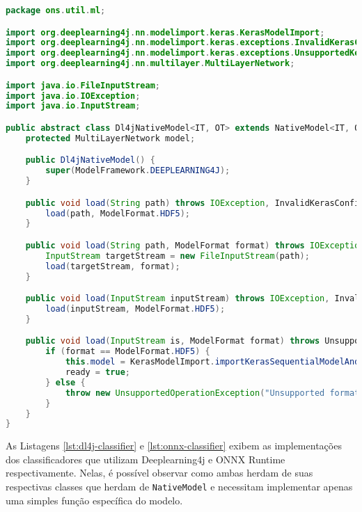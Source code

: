 \begin{lstlisting}[language=Java, caption=Implementação da classe Dl4jNativeModel, label={lst:dl4j-native-model}]
package ons.util.ml;

import org.deeplearning4j.nn.modelimport.keras.KerasModelImport;
import org.deeplearning4j.nn.modelimport.keras.exceptions.InvalidKerasConfigurationException;
import org.deeplearning4j.nn.modelimport.keras.exceptions.UnsupportedKerasConfigurationException;
import org.deeplearning4j.nn.multilayer.MultiLayerNetwork;

import java.io.FileInputStream;
import java.io.IOException;
import java.io.InputStream;

public abstract class Dl4jNativeModel<IT, OT> extends NativeModel<IT, OT> {
    protected MultiLayerNetwork model;

    public Dl4jNativeModel() {
        super(ModelFramework.DEEPLEARNING4J);
    }

    public void load(String path) throws IOException, InvalidKerasConfigurationException, UnsupportedKerasConfigurationException {
        load(path, ModelFormat.HDF5);
    }

    public void load(String path, ModelFormat format) throws IOException, UnsupportedKerasConfigurationException, InvalidKerasConfigurationException {
        InputStream targetStream = new FileInputStream(path);
        load(targetStream, format);
    }

    public void load(InputStream inputStream) throws IOException, InvalidKerasConfigurationException, UnsupportedKerasConfigurationException {
        load(inputStream, ModelFormat.HDF5);
    }

    public void load(InputStream is, ModelFormat format) throws UnsupportedKerasConfigurationException, IOException, InvalidKerasConfigurationException {
        if (format == ModelFormat.HDF5) {
            this.model = KerasModelImport.importKerasSequentialModelAndWeights(is);
            ready = true;
        } else {
            throw new UnsupportedOperationException("Unsupported format");
        }
    }
}
\end{lstlisting}

As Listagens \ref{lst:dl4j-classifier} e \ref{lst:onnx-classifier} exibem as implementações dos classificadores que utilizam Deeplearning4j e ONNX Runtime respectivamente. Nelas, é possível observar como ambas herdam de suas respectivas classes que herdam de \texttt{NativeModel} e necessitam implementar apenas uma simples função específica do modelo.

